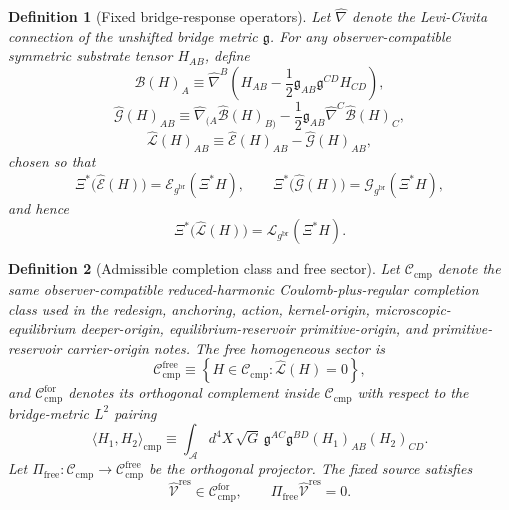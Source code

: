 \documentclass[11pt]{article}
\newcommand{\Sub}{\mathcal A}
\newcommand{\ObserverMap}{\Xi}
\newcommand{\BridgeMetric}{\mathfrak g}
\newcommand{\ObserverMetric}{g^{\mathrm{br}}}
\newcommand{\ResidualLift}{\widehat{\mathcal V}^{\mathrm{res}}}
\newcommand{\SubEinLin}{\widehat{\mathcal E}}
\newcommand{\SubGaugeVec}{\widehat{\mathcal B}}
\newcommand{\SubGaugeBook}{\widehat{\mathcal G}}
\newcommand{\SubReducedEin}{\widehat{\mathcal L}}
\newcommand{\FreeProj}{\Pi_{\mathrm{free}}}
\newcommand{\ReducedEin}{\mathcal L_{\ObserverMetric}}
\newcommand{\GaugeBook}{\mathcal G_{\ObserverMetric}}
\newcommand{\EinLin}{\mathcal E_{\ObserverMetric}}
\newcommand{\CompClass}{\mathscr C_{\mathrm{cmp}}}
\newcommand{\CompFree}{\mathscr C_{\mathrm{cmp}}^{\mathrm{free}}}
\newcommand{\CompForced}{\mathscr C_{\mathrm{cmp}}^{\mathrm{for}}}
\newtheorem{definition}{Definition}
\begin{document}
\begin{definition}[Fixed bridge-response operators]
\label{def:operators}
Let \(\widehat\nabla\) denote the Levi-Civita connection of the unshifted bridge metric \(\BridgeMetric\). For any observer-compatible symmetric substrate tensor \(H_{AB}\), define
\begin{equation}
\SubGaugeVec(H)_A
\equiv
\widehat\nabla^B\!\left(
H_{AB}
-\frac12 \BridgeMetric_{AB}\BridgeMetric^{CD}H_{CD}
\right),
\label{eq:subB}
\end{equation}
\begin{equation}
\SubGaugeBook(H)_{AB}
\equiv
\widehat\nabla_{(A}\SubGaugeVec(H)_{B)}
-\frac12 \BridgeMetric_{AB}\widehat\nabla^C\SubGaugeVec(H)_C,
\label{eq:subG}
\end{equation}
\begin{equation}
\SubReducedEin(H)_{AB}
\equiv
\SubEinLin(H)_{AB}-\SubGaugeBook(H)_{AB},
\label{eq:subL}
\end{equation}
chosen so that
\begin{equation}
\ObserverMap^*\bigl(\SubEinLin(H)\bigr)=\EinLin(\ObserverMap^*H),
\qquad
\ObserverMap^*\bigl(\SubGaugeBook(H)\bigr)=\GaugeBook(\ObserverMap^*H),
\label{eq:intertwine1}
\end{equation}
and hence
\begin{equation}
\ObserverMap^*\bigl(\SubReducedEin(H)\bigr)
=
\ReducedEin(\ObserverMap^*H).
\label{eq:intertwine2}
\end{equation}
\end{definition}

\begin{definition}[Admissible completion class and free sector]
\label{def:class}
Let \(\CompClass\) denote the same observer-compatible reduced-harmonic Coulomb-plus-regular completion class used in the redesign, anchoring, action, kernel-origin, microscopic-equilibrium deeper-origin, equilibrium-reservoir primitive-origin, and primitive-reservoir carrier-origin notes. The free homogeneous sector is
\begin{equation}
\CompFree
\equiv
\left\{
H\in\CompClass:\SubReducedEin(H)=0
\right\},
\label{eq:freeclass}
\end{equation}
and \(\CompForced\) denotes its orthogonal complement inside \(\CompClass\) with respect to the bridge-metric \(L^2\) pairing
\begin{equation}
\langle H_1,H_2\rangle_{\mathrm{cmp}}
\equiv
\int_{\Sub} d^4X\,\sqrt{G}\,
\BridgeMetric^{AC}\BridgeMetric^{BD}(H_1)_{AB}(H_2)_{CD}.
\label{eq:inner}
\end{equation}
Let \(\FreeProj:\CompClass\to\CompFree\) be the orthogonal projector. The fixed source satisfies
\begin{equation}
\ResidualLift\in\CompForced,
\qquad
\FreeProj\ResidualLift=0.
\label{eq:sourcefree}
\end{equation}
\end{definition}
\end{document}
